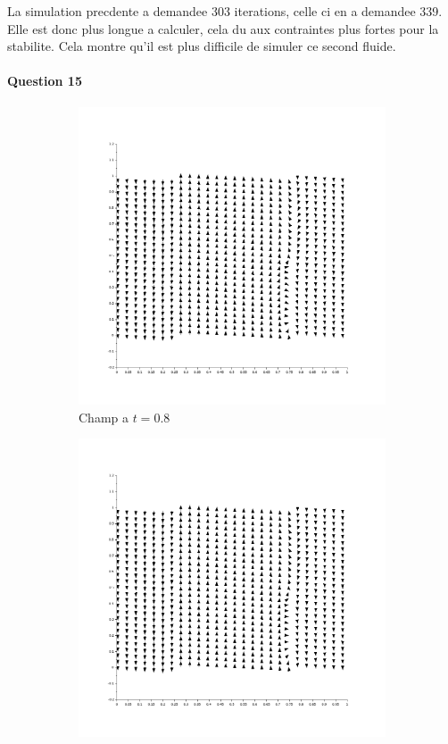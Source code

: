 \documentclass{article}
\begin{document}
La simulation precdente a demandee 303 iterations, celle ci en a demandee 339. Elle est donc plus longue a calculer, cela du aux contraintes plus fortes pour la stabilite. Cela montre qu'il est plus difficile de simuler ce second fluide.

\paragraph{Question 15}
\begin{figure}
	\centering
	\begin{subfigure}{0.3\textwidth}
		\includegraphics[width=\textwidth]{speed_field_0,8.png}
		\caption{Champ a $t=0.8$}
	\end{subfigure}
	\begin{subfigure}{0.3\textwidth}
		\includegraphics[width=\textwidth]{speed_field_1,2.png}

\end{subfigure}
\end{figure}
\end{document}
